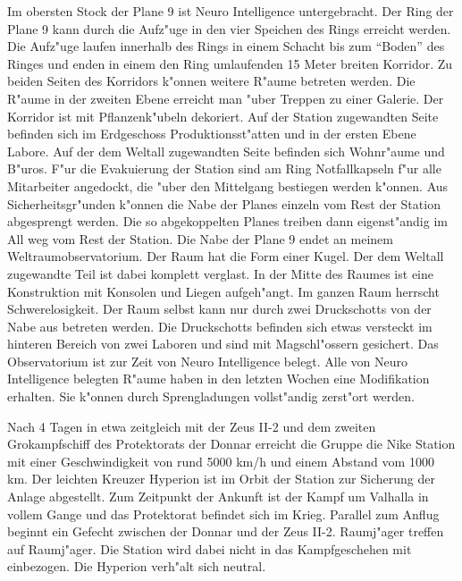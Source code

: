 Im obersten Stock der Plane 9 ist Neuro Intelligence untergebracht. Der Ring der Plane 9 kann durch die Aufz"uge in den vier Speichen des Rings erreicht werden. Die Aufz"uge laufen innerhalb des Rings in einem Schacht bis zum "`Boden"' des Ringes und enden in einem den Ring umlaufenden 15 Meter breiten Korridor. Zu beiden Seiten des Korridors k"onnen weitere R"aume betreten werden. Die R"aume in der zweiten Ebene erreicht man "uber Treppen zu einer Galerie. Der Korridor ist mit Pflanzenk"ubeln dekoriert. Auf der Station zugewandten Seite befinden sich im Erdgeschoss Produktionsst"atten und in der ersten Ebene Labore. Auf der dem Weltall zugewandten Seite befinden sich Wohnr"aume und B"uros. F"ur die Evakuierung der Station sind am Ring Notfallkapseln f"ur alle Mitarbeiter angedockt, die "uber den Mittelgang bestiegen werden k"onnen. Aus Sicherheitsgr"unden k"onnen die Nabe der Planes einzeln vom Rest der Station abgesprengt werden. Die so abgekoppelten Planes treiben dann eigenst"andig im All weg vom Rest der Station. Die Nabe der Plane 9 endet an meinem Weltraumobservatorium. Der Raum hat die Form einer Kugel. Der dem Weltall zugewandte Teil ist dabei komplett verglast. In der Mitte des Raumes ist eine Konstruktion mit Konsolen und Liegen aufgeh"angt. Im ganzen Raum herrscht Schwerelosigkeit. Der Raum selbst kann nur durch zwei Druckschotts von der Nabe aus betreten werden. Die Druckschotts befinden sich etwas versteckt im hinteren Bereich von zwei Laboren und sind mit Magschl"ossern gesichert. Das Observatorium ist zur Zeit von Neuro Intelligence belegt. Alle von Neuro Intelligence belegten R"aume haben in den letzten Wochen eine Modifikation erhalten. Sie k"onnen durch Sprengladungen vollst"andig zerst"ort werden.



Nach 4 Tagen in etwa zeitgleich mit der Zeus II-2 und dem zweiten Gro\3kampfschiff des Protektorats der Donnar erreicht die Gruppe die Nike Station mit einer Geschwindigkeit von rund 5000 km/h und einem Abstand vom 1000 km. Der leichten Kreuzer Hyperion ist im Orbit der Station zur Sicherung der Anlage abgestellt. Zum Zeitpunkt der Ankunft ist der Kampf um Valhalla in vollem Gange und das Protektorat befindet sich im Krieg. Parallel zum Anflug beginnt ein Gefecht zwischen der Donnar und der Zeus II-2. Raumj"ager treffen auf Raumj"ager. Die Station wird dabei nicht in das Kampfgeschehen mit einbezogen. Die Hyperion verh"alt sich neutral.

